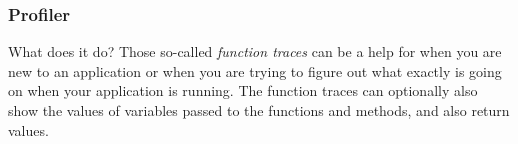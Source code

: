 \begin{frame}\frametitle{Profiler}
    \begin{block}{What does it do?}
        Those so-called \emph{function traces} can be a help for when you are new to an application or when you are trying to figure out what exactly is going on when your application is running. The function traces can optionally also show the values of variables passed to the functions and methods, and also return values.
    \end{block}
\end{frame}